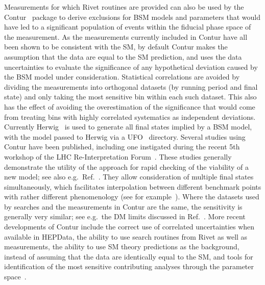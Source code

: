 \documentclass[a4paper,aps,prd,longbibliography,notitlepage,showpacs,amsmath,amssymb,superscriptaddress,nofootinbib,floatfix,11pt,preprintnumbers]{revtex4-1-mod}
\newcommand{\hepdata}{\textsf{HEPData}\xspace}
\newcommand{\rivet}{\textsf{Rivet}\xspace}
\newcommand{\contur}{\textsf{Contur}\xspace}
\newcommand{\eg}{e.g.\xspace}
\begin{document}
Measurements for which \rivet routines are provided can also be used by the \contur~\cite{Butterworth:2016sqg} package to derive exclusions for BSM models and parameters that would have led to a significant population of events within the fiducial phase space of the measurement.
As the measurements currently included in \contur have all been shown to be consistent with the SM, by default \contur makes the assumption that the data are equal to the SM prediction, and uses the data uncertainties to evaluate the significance of any hypothetical deviation caused by the BSM model under consideration. Statistical correlations are avoided by dividing the measurements into orthogonal datasets (by running period and final state) and only taking the most sensitive bin within each such dataset. This also has the effect of avoiding the overestimation of the significance that would come from treating bins with highly correlated systematics as independent deviations. Currently Herwig~\cite{Bellm:2015jjp} is used to generate all final states implied by a BSM model, with the model passed to Herwig via a UFO~\cite{Degrande:2011ua} directory. Several studies using \contur have been published,
including one instigated during the recent 5th workshop of the LHC Re-Interpretation Forum~\cite{Allanach:2019mfl}. These studies generally demonstrate the utility of the approach for rapid
checking of the viability of a new model; see also \eg~Ref.~\cite{Butterworth:2019iff}. They allow consideration of multiple final states simultaneously, which facilitates interpolation between different benchmark points with rather different phenomenology (see for example~\cite{Amrith:2018yfb}). Where the datasets used by searches and the measurements in \contur are the same, the sensitivity is generally very similar; see \eg~the DM limits discussed in Ref.~\cite{Butterworth:2019wnt}. More recent developments of \contur include the correct use of correlated uncertainties when available in \hepdata, the ability to use search routines from \rivet as well as measurements, the ability to use SM theory predictions as the background, instead of assuming that the data are identically equal to the SM, and tools for identification of the most sensitive contributing analyses through the parameter space~\cite{Buckley:2020wzk}\@.

\end{document}
